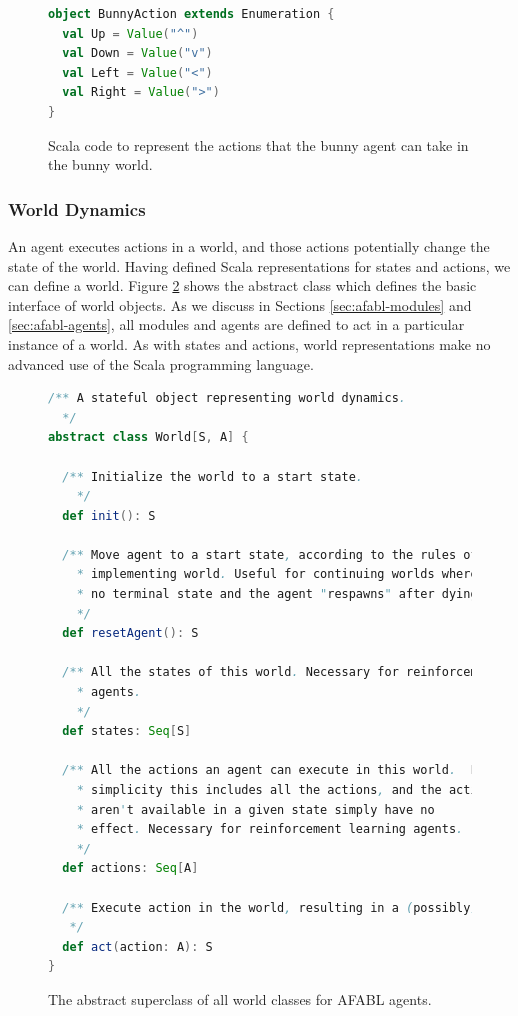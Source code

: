 \begin{figure}[h]
\begin{center}

\begin{lstlisting}[language=Scala]
object BunnyAction extends Enumeration {
  val Up = Value("^")
  val Down = Value("v")
  val Left = Value("<")
  val Right = Value(">")
}
\end{lstlisting}

\caption{Scala code to represent the actions that the bunny agent can take in the bunny world.}
\end{center}
\label{fig:bunny-action-code}
\end{figure}

\subsubsection{World Dynamics}

An agent executes actions in a world, and those actions potentially change the state of the world. Having defined Scala representations for states and actions, we can define a world. Figure \ref{fig:world-code} shows the abstract class which defines the basic interface of world objects. As we discuss in Sections \ref{sec:afabl-modules} and \ref{sec:afabl-agents}, all modules and agents are defined to act in a particular instance of a world. As with states and actions, world representations make no advanced use of the Scala programming language.

\begin{figure}[h]
\begin{center}

\begin{lstlisting}[language=Scala]
/** A stateful object representing world dynamics.
  */
abstract class World[S, A] {

  /** Initialize the world to a start state.
    */
  def init(): S

  /** Move agent to a start state, according to the rules of the
    * implementing world. Useful for continuing worlds where there is
    * no terminal state and the agent "respawns" after dying.
    */
  def resetAgent(): S

  /** All the states of this world. Necessary for reinforcement learning
    * agents.
    */
  def states: Seq[S]

  /** All the actions an agent can execute in this world.  For
    * simplicity this includes all the actions, and the actions that
    * aren't available in a given state simply have no
    * effect. Necessary for reinforcement learning agents.
    */
  def actions: Seq[A]

  /** Execute action in the world, resulting in a (possibly) new state.
   */
  def act(action: A): S
}
\end{lstlisting}
\caption{The abstract superclass of all world classes for AFABL agents.}
\end{center}
\label{fig:world-code}
\end{figure}


